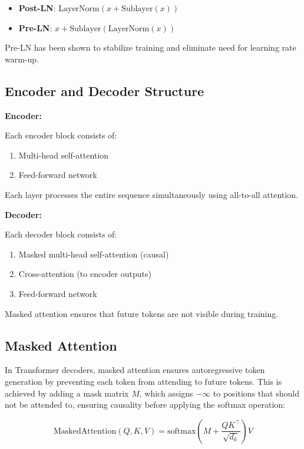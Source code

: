 \begin{itemize}
    \item \textbf{Post-LN}: $\text{LayerNorm}(x + \text{Sublayer}(x))$
    \item \textbf{Pre-LN}: $x + \text{Sublayer}(\text{LayerNorm}(x))$
\end{itemize}

Pre-LN has been shown to stabilize training and eliminate need for learning rate warm-up.

\subsection{Encoder and Decoder Structure}

\textbf{Encoder:}

Each encoder block consists of:
\begin{enumerate}
    \item Multi-head self-attention
    \item Feed-forward network
\end{enumerate}

Each layer processes the entire sequence simultaneously using all-to-all attention.

\textbf{Decoder:}

Each decoder block consists of:
\begin{enumerate}
    \item Masked multi-head self-attention (causal)
    \item Cross-attention (to encoder outputs)
    \item Feed-forward network
\end{enumerate}

Masked attention ensures that future tokens are not visible during training.

\subsection{Masked Attention}

In Transformer decoders, masked attention ensures autoregressive token generation by preventing each token from attending to future tokens. This is achieved by adding a mask matrix $M$, which assigns $-\infty$ to positions that should not be attended to, ensuring causality before applying the softmax operation:

\[
\text{MaskedAttention}(Q, K, V) = \text{softmax} \left( M + \frac{QK^\top}{\sqrt{d_k}} \right) V
\]

